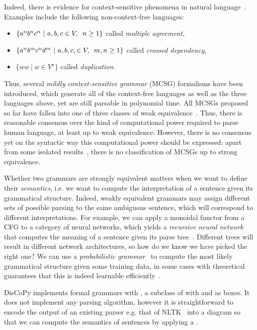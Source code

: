 Indeed, there is evidence for context-sensitive phenomena in natural language~\cite{Shieber87}.
Examples include the following non-context-free languages:
\begin{itemize}
  \item $\{ a^n b^n c^n \ \vert \ a, b, c \in V, \enspace n \geq 1 \}$ called \emph{multiple agreement},
  \item $\{ a^n b^m c^n d^m \ \vert \ a, b, c, \in V, \enspace m, n \geq 1 \}$ called \emph{crossed dependency},
  \item $\{ w w \ \vert \ w \in V^\star \}$ called \emph{duplication}.
\end{itemize}
Thus, several \emph{mildly context-sensitive grammar} (MCSG) formalisms have been introduced, which generate all of the context-free languages as well as the three languages above, yet are still parsable in polynomial time.
All MCSGs proposed so far have fallen into one of three classes of weak equivalence~\cite{Weir88}.
Thus, there is reasonable consensus over the kind of computational power required to parse human language, at least up to weak equivalence.
However, there is no consensus yet on the syntactic way this computational power should be expressed: apart from some isolated results~\cite{SchifferMaletti21}, there is no classification of MCSGs up to strong equivalence.

Whether two grammars are strongly equivalent matters when we want to define their \emph{semantics}, i.e. we want to compute the interpretation of a sentence given its grammatical structure.
Indeed, weakly equivalent grammars may assign different sets of possible parsing to the same ambiguous sentence, which will correspond to different interpretations.
For example, we can apply a monoidal functor from a CFG to a category of neural networks, which yields a \emph{recursive neural network} that computes the meaning of a sentence given its parse tree~\cite{SocherEtAl11,SocherEtAl13}.
Different trees will result in different network architectures, so how do we know we have picked the right one?
We can use a \emph{probabilistic grammar}~\cite{Salomaa69} to compute the most likely grammatical structure given some training data, in some cases with theoretical guarantees that this is indeed learnable efficiently~\cite{ClarkEtAl06,ShibataYoshinaka16}.

DisCoPy implements formal grammars with , a subclass of  with  and  as boxes.
It does not implement any parsing algorithm, however it is straightforward to encode the output of an existing parser e.g. that of NLTK~\cite{LoperBird02} into a  diagram so that we can compute the semantics of sentences by applying a .

